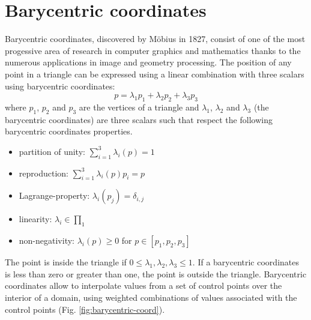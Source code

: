 \section{Barycentric coordinates}
Barycentric coordinates, discovered by Möbius in 1827, consist of one of the most progessive area of research in computer graphics and mathematics thanks to the numerous applications in image and geometry processing.
The position of any point in a triangle can be expressed using a linear combination with three scalars using barycentric coordinates:
$$ p = \lambda_1 p_1 + \lambda_2 p_2 + \lambda_3 p_3$$
where $p_1$, $p_2$ and $p_3$ are the vertices of a triangle and $\lambda_1$, $\lambda_2$ and $\lambda_3$ (the barycentric coordinates) are three scalars such that
respect the following barycentric coordinates properties.
\begin{itemize}
  \item partition of unity: $\sum_{i=1}^3 \lambda_{i}(p) = 1$
  \item reproduction: $\sum_{i=1}^3 \lambda_{i}(p)p_i = p$
  \item Lagrange-property: $\lambda_i(p_j) = \delta_{i, j}$
  \item linearity: $\lambda_i \in \prod_1$
  \item non-negativity: $\lambda_i(p)\geq 0$ for $p \in [p_1, p_2, p_3]$
\end{itemize}
The point is inside the triangle if $0 \leq \lambda_1, \lambda_2, \lambda_3 \leq 1$. If a barycentric coordinates is less than zero or greater than one, the point is outside the triangle.
Barycentric coordinates allow to interpolate values from a set of control points over the interior of a domain, using weighted combinations of values associated with the control points (Fig. \ref{fig:barycentric-coord}).
